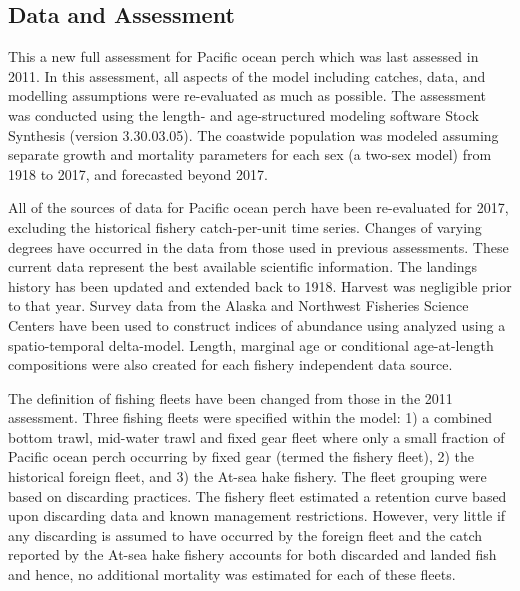 \documentclass[12pt,]{article}
\begin{document}
\FloatBarrier

\subsection*{Data and Assessment}\label{data-and-assessment}

This a new full assessment for Pacific ocean perch which was last
assessed in 2011. In this assessment, all aspects of the model including
catches, data, and modelling assumptions were re-evaluated as much as
possible. The assessment was conducted using the length- and
age-structured modeling software Stock Synthesis (version 3.30.03.05).
The coastwide population was modeled assuming separate growth and
mortality parameters for each sex (a two-sex model) from 1918 to 2017,
and forecasted beyond 2017.

All of the sources of data for Pacific ocean perch have been
re-evaluated for 2017, excluding the historical fishery catch-per-unit
time series. Changes of varying degrees have occurred in the data from
those used in previous assessments. These current data represent the
best available scientific information. The landings history has been
updated and extended back to 1918. Harvest was negligible prior to that
year. Survey data from the Alaska and Northwest Fisheries Science
Centers have been used to construct indices of abundance using analyzed
using a spatio-temporal delta-model. Length, marginal age or conditional
age-at-length compositions were also created for each fishery
independent data source.

The definition of fishing fleets have been changed from those in the
2011 assessment. Three fishing fleets were specified within the model:
1) a combined bottom trawl, mid-water trawl and fixed gear fleet where
only a small fraction of Pacific ocean perch occurring by fixed gear
(termed the fishery fleet), 2) the historical foreign fleet, and 3) the
At-sea hake fishery. The fleet grouping were based on discarding
practices. The fishery fleet estimated a retention curve based upon
discarding data and known management restrictions. However, very little
if any discarding is assumed to have occurred by the foreign fleet and
the catch reported by the At-sea hake fishery accounts for both
discarded and landed fish and hence, no additional mortality was
estimated for each of these fleets.
\end{document}
